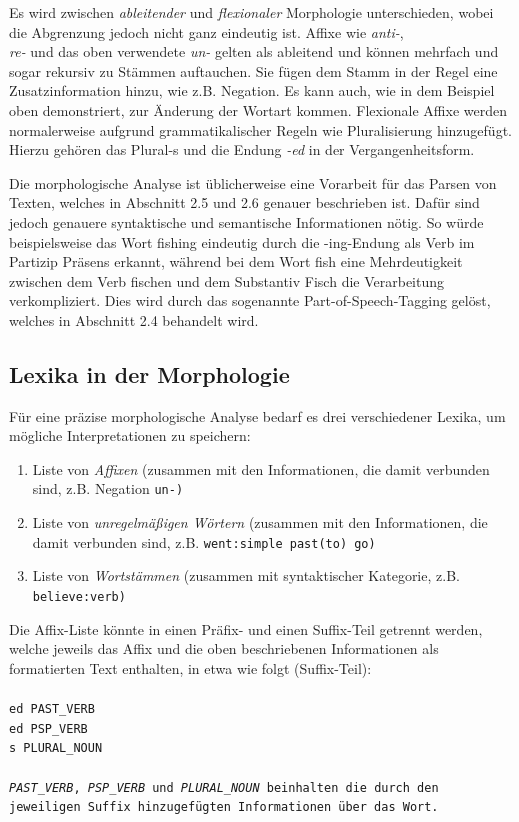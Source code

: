 \documentclass[12pt]{report}
\begin{document}
Es wird zwischen \textit{ableitender} und \textit{flexionaler} Morphologie unterschieden, wobei die Abgrenzung jedoch nicht ganz eindeutig ist. Affixe wie \textit{\glqq  anti-\grqq{}},\\ \textit{\glqq  re-\grqq{}} und das oben verwendete \textit{\glqq  un-\grqq{}} gelten als ableitend und können mehrfach und sogar rekursiv zu Stämmen auftauchen. Sie fügen dem Stamm in der Regel eine Zusatzinformation hinzu, wie z.B. Negation. Es kann auch, wie in dem Beispiel oben demonstriert, zur Änderung der Wortart kommen. Flexionale Affixe werden normalerweise aufgrund grammatikalischer Regeln wie Pluralisierung hinzugefügt. Hierzu gehören das Plural-\glqq  s\grqq{} und die Endung \textit{\glqq  -ed\grqq{}} in der Vergangenheitsform. 

Die morphologische Analyse ist üblicherweise eine Vorarbeit für das Parsen von Texten, welches in Abschnitt 2.5 und 2.6 genauer beschrieben ist. Dafür sind jedoch genauere syntaktische und semantische Informationen nötig. So würde beispielsweise das Wort \glqq  fishing\grqq{} eindeutig durch die \glqq  -ing\grqq{}-Endung als Verb im Partizip Präsens erkannt, während bei dem Wort \glqq  fish\grqq{} eine Mehrdeutigkeit zwischen dem Verb \glqq  fischen\grqq{} und dem Substantiv \glqq  Fisch\grqq{} die Verarbeitung verkompliziert. Dies wird durch das sogenannte Part-of-Speech-Tagging gelöst, welches in Abschnitt 2.4 behandelt wird.

\subsection{Lexika in der Morphologie}
Für eine präzise morphologische Analyse bedarf es drei verschiedener Lexika, um mögliche Interpretationen zu speichern:

\begin{enumerate}
\item Liste von \textit{Affixen} (zusammen mit den Informationen, die damit verbunden sind, z.B. Negation \tt \glqq  un-\grqq{}\rm)
\item Liste von \textit{unregelmäßigen Wörtern} (zusammen mit den Informationen, die damit verbunden sind, z.B. \tt \glqq  went\grqq{}:simple past\glqq  (to) go\grqq{}\rm)
\item Liste von \textit{Wortstämmen} (zusammen mit syntaktischer Kategorie, z.B. \tt \glqq  believe\grqq{}:verb\rm)
\end{enumerate}

Die Affix-Liste könnte in einen Präfix- und einen Suffix-Teil getrennt werden, welche jeweils das Affix und die oben beschriebenen Informationen als formatierten Text enthalten, in etwa wie folgt (Suffix-Teil):
\\
\tt\\
ed PAST\_VERB\\
ed PSP\_VERB\\
s PLURAL\_NOUN\\
\rm\\
\textit{PAST\_VERB}, \textit{PSP\_VERB} und \textit{PLURAL\_NOUN} beinhalten die durch den jeweiligen Suffix hinzugefügten Informationen über das Wort. 
\end{document}
